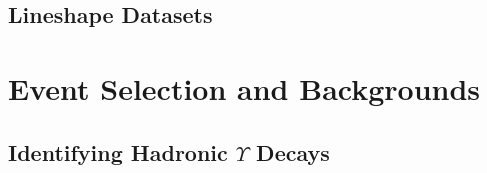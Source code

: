 \documentclass[aps,prd,preprint,superscriptaddress,tightenlines,nofootinbib,floatfix]{revtex4}
\begin{document}
%
\subsection{Lineshape Datasets}
%



%
\section{Event Selection and Backgrounds}
%


%
\subsection{Identifying Hadronic $\Upsilon$ Decays}
%
\end{document}
